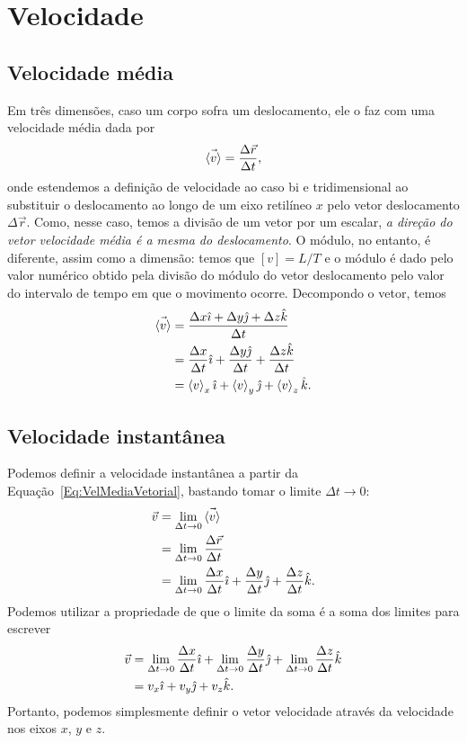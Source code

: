 \section{Velocidade}

\subsection{Velocidade média}

Em três dimensões, caso um corpo sofra um deslocamento, ele o faz com uma velocidade média dada por
\begin{equation}\label{Eq:VelMediaVetorial}
  \vec{\left\langle{v}\right\rangle} = \frac{\Delta\vec{r}}{\Delta t},
\end{equation}
%
onde estendemos a definição de velocidade ao caso bi e tridimensional ao substituir o deslocamento ao longo de um eixo retilíneo $x$ pelo vetor deslocamento $\Delta \vec{r}$. Como, nesse caso, temos a divisão de um vetor por um escalar, \emph{a direção do vetor velocidade média é a mesma do deslocamento}. O módulo, no entanto, é diferente, assim como a dimensão: temos que $[v] = L/T$ e o módulo é dado pelo valor numérico obtido pela divisão do módulo do vetor deslocamento pelo valor do intervalo de tempo em que o movimento ocorre. Decompondo o vetor, temos
\begin{align}
  \vec{\left\langle{v}\right\rangle} &= \frac{\Delta x \hat{\imath} + \Delta y\hat{\jmath} + \Delta z\hat{k}}{\Delta t} \\
  &= \frac{\Delta x}{\Delta t} \hat{\imath} + \frac{\Delta y\hat{\jmath}}{\Delta t} + \frac{\Delta z\hat{k}}{\Delta t} \\
  &= \left\langle{v}\right\rangle_x \hat{\imath} + \left\langle{v}\right\rangle_y \hat{\jmath} + \left\langle{v}\right\rangle_z \hat{k}.
\end{align}

\subsection{Velocidade instantânea}

Podemos definir a velocidade instantânea a partir da Equação~\ref{Eq:VelMediaVetorial}, bastando tomar o limite $\Delta t \to 0$:
\begin{align}
    \vec{v} &= \lim_{\Delta t \to 0} \vec{\left\langle{v}\right\rangle} \\
    &= \lim_{\Delta t \to 0} \frac{\Delta\vec{r}}{\Delta t} \\
    &= \lim_{\Delta t \to 0} \frac{\Delta x}{\Delta t}\hat{\imath} + \frac{\Delta y}{\Delta t}\hat{\jmath} + \frac{\Delta z}{\Delta t}\hat{k}.
\end{align}
%
Podemos utilizar a propriedade de que o limite da soma é a soma dos limites para escrever
\begin{align}
  \vec{v} &= \lim_{\Delta t \to 0} \frac{\Delta x}{\Delta t}\hat{\imath} + \lim_{\Delta t \to 0} \frac{\Delta y}{\Delta t}\hat{\jmath} + \lim_{\Delta t \to 0} \frac{\Delta z}{\Delta t}\hat{k} \\
  &= v_x \hat{\imath} + v_y \hat{\jmath} + v_z \hat{k}.
\end{align}
%
Portanto, podemos simplesmente definir o vetor velocidade através da velocidade nos eixos $x$, $y$ e $z$.

